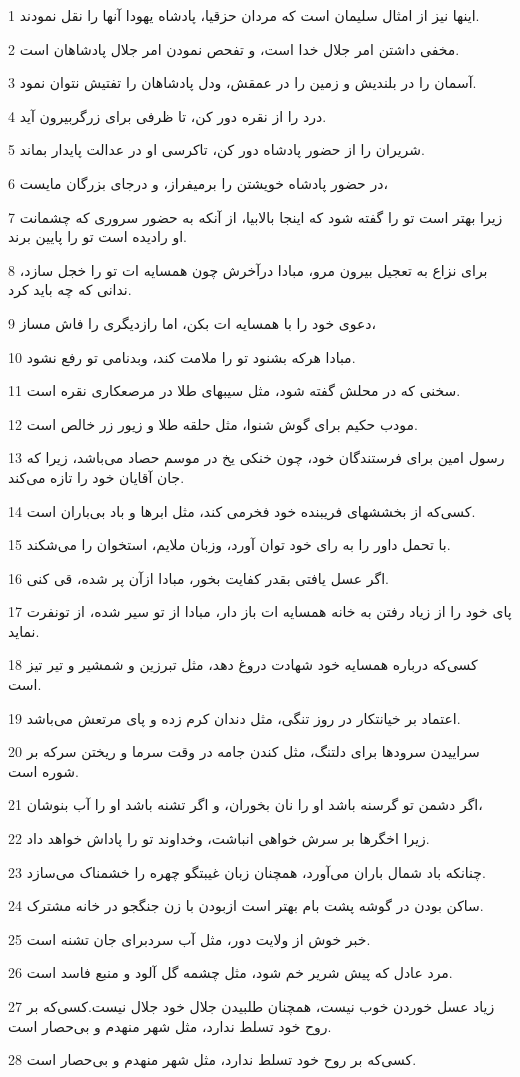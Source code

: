 \par 1 اینها نیز از امثال سلیمان است که مردان حزقیا، پادشاه یهودا آنها را نقل نمودند.
\par 2 مخفی داشتن امر جلال خدا است، و تفحص نمودن امر جلال پادشاهان است.
\par 3 آسمان را در بلندیش و زمین را در عمقش، ودل پادشاهان را تفتیش نتوان نمود.
\par 4 درد را از نقره دور کن، تا ظرفی برای زرگربیرون آید.
\par 5 شریران را از حضور پادشاه دور کن، تاکرسی او در عدالت پایدار بماند.
\par 6 در حضور پادشاه خویشتن را برمیفراز، و درجای بزرگان مایست،
\par 7 زیرا بهتر است تو را گفته شود که اینجا بالابیا، از آنکه به حضور سروری که چشمانت او رادیده است تو را پایین برند.
\par 8 برای نزاع به تعجیل بیرون مرو، مبادا درآخرش چون همسایه ات تو را خجل سازد، ندانی که چه باید کرد.
\par 9 دعوی خود را با همسایه ات بکن، اما رازدیگری را فاش مساز،
\par 10 مبادا هر‌که بشنود تو را ملامت کند، وبدنامی تو رفع نشود.
\par 11 سخنی که در محلش گفته شود، مثل سیبهای طلا در مرصعکاری نقره است.
\par 12 مودب حکیم برای گوش شنوا، مثل حلقه طلا و زیور زر خالص است.
\par 13 رسول امین برای فرستندگان خود، چون خنکی یخ در موسم حصاد می‌باشد، زیرا که جان آقایان خود را تازه می‌کند.
\par 14 کسی‌که از بخششهای فریبنده خود فخرمی کند، مثل ابرها و باد بی‌باران است.
\par 15 با تحمل داور را به رای خود توان آورد، وزبان ملایم، استخوان را می‌شکند. 
\par 16 اگر عسل یافتی بقدر کفایت بخور، مبادا ازآن پر شده، قی کنی.
\par 17 پای خود را از زیاد رفتن به خانه همسایه ات باز دار، مبادا از تو سیر شده، از تونفرت نماید.
\par 18 کسی‌که درباره همسایه خود شهادت دروغ دهد، مثل تبرزین و شمشیر و تیر تیز است.
\par 19 اعتماد بر خیانتکار در روز تنگی، مثل دندان کرم زده و پای مرتعش می‌باشد.
\par 20 سراییدن سرودها برای دلتنگ، مثل کندن جامه در وقت سرما و ریختن سرکه بر شوره است.
\par 21 اگر دشمن تو گرسنه باشد او را نان بخوران، و اگر تشنه باشد او را آب بنوشان،
\par 22 زیرا اخگرها بر سرش خواهی انباشت، وخداوند تو را پاداش خواهد داد.
\par 23 چنانکه باد شمال باران می‌آورد، همچنان زبان غیبتگو چهره را خشمناک می‌سازد.
\par 24 ساکن بودن در گوشه پشت بام بهتر است ازبودن با زن جنگجو در خانه مشترک.
\par 25 خبر خوش از ولایت دور، مثل آب سردبرای جان تشنه است.
\par 26 مرد عادل که پیش شریر خم شود، مثل چشمه گل آلود و منبع فاسد است.
\par 27 زیاد عسل خوردن خوب نیست، همچنان طلبیدن جلال خود جلال نیست.کسی‌که بر روح خود تسلط ندارد، مثل شهر منهدم و بی‌حصار است.
\par 28 کسی‌که بر روح خود تسلط ندارد، مثل شهر منهدم و بی‌حصار است.
 
